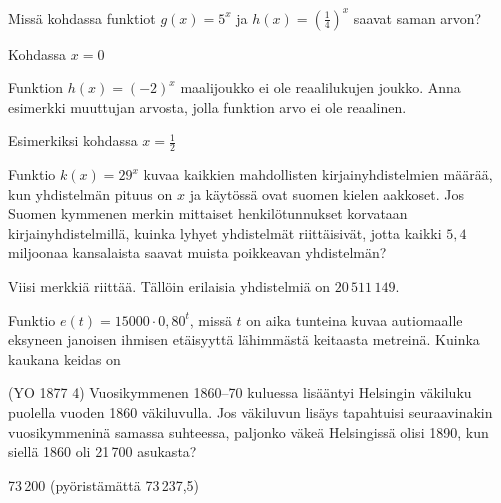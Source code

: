\begin{tehtavasivu}
\begin{tehtava}
Missä kohdassa funktiot $ g(x)=5^{x} $ ja $ h(x)=(\frac{1}{4})^{x} $ saavat saman arvon?
\begin{vastaus}
Kohdassa $x=0$
\end{vastaus}
\end{tehtava}

\begin{tehtava}
Funktion $ h(x)=(-2)^{x}$ maalijoukko ei ole reaalilukujen joukko. Anna esimerkki muuttujan arvosta, jolla funktion arvo ei ole reaalinen.
\begin{vastaus}
Esimerkiksi kohdassa $x = \frac{1}{2}$
\end{vastaus}
\end{tehtava}

\begin{tehtava}
Funktio $ k(x)=29^{x}$ kuvaa kaikkien mahdollisten kirjainyhdistelmien määrää, kun yhdistelmän pituus on $ x $ ja käytössä ovat suomen kielen aakkoset. Jos Suomen kymmenen merkin mittaiset henkilötunnukset korvataan kirjainyhdistelmillä, kuinka lyhyet yhdistelmät riittäisivät, jotta kaikki $ 5,4 $ miljoonaa kansalaista saavat muista poikkeavan yhdistelmän?
\begin{vastaus}
Viisi merkkiä riittää. Tällöin erilaisia yhdistelmiä on $20\,511\,149$.
\end{vastaus}
\end{tehtava}

\begin{tehtava}
Funktio $ e(t)=15000\cdot 0,80^{t}$, missä $ t $ on aika tunteina kuvaa autiomaalle eksyneen janoisen ihmisen etäisyyttä lähimmästä keitaasta metreinä. Kuinka kaukana keidas on 
\begin{vastaus}
\end{vastaus}
\end{tehtava}

\begin{tehtava}
(YO 1877 4) Vuosikymmenen 1860--70 kuluessa lisääntyi Helsingin väkiluku puolella vuoden 1860 väkiluvulla. Jos väkiluvun lisäys tapahtuisi seuraavinakin vuosikymmeninä samassa suhteessa, paljonko väkeä Helsingissä olisi 1890, kun siellä 1860 oli 21\,700 asukasta? 
	\begin{vastaus}
	73\,200 (pyöristämättä 73\,237,5)
	\end{vastaus}
\end{tehtava}



\end{tehtavasivu}
